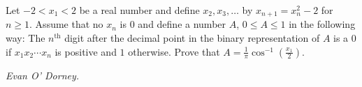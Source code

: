 Let $-2 < x_1 < 2$ be a real number and define $x_2, x_3, \ldots$ by $x_{n+1} = x_n^2-2$ for $n \geq 1$. Assume that no $x_n$ is $0$ and define a number $A$, $0 \leq A \leq 1$ in the following way: The $n^{\text{th}}$ digit after the decimal point in the binary representation of $A$ is a $0$ if $x_1x_2\cdots x_n$ is positive and $1$ otherwise. Prove that $A = \frac{1}{\pi}\cos^{-1}\left(\frac{x_1}{2}\right)$.

\textit{Evan O' Dorney.}